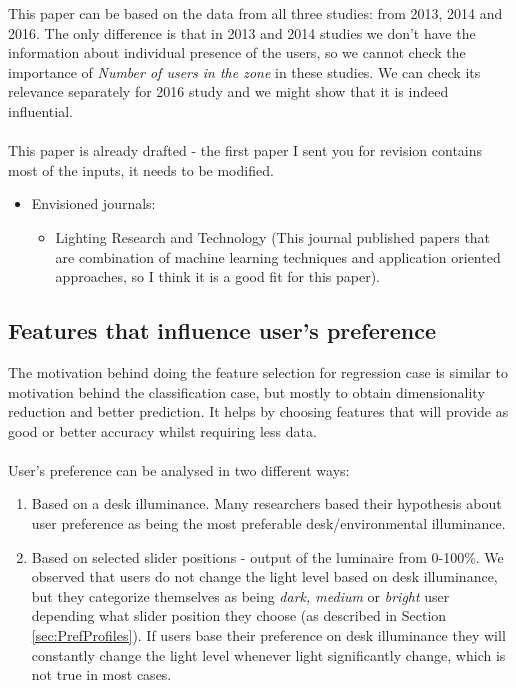 \documentclass[a4paper]{article}
\begin{document}
This paper can be based on the data from all three studies: from 2013, 2014 and 2016. The only difference is that in 2013 and 2014 studies we don't have the information about individual presence of the users, so we cannot check the importance of \textit{Number of users in the zone} in these studies. We can check its relevance separately for 2016 study and we might show that it is indeed influential.
\\\\
\color{red} This paper is already drafted - the first paper I sent you for revision contains most of the inputs, it needs to be modified.
\color{black}

	\begin{itemize}
		\item Envisioned journals:
			\begin{itemize}
				\color{blue}
				\item Lighting Research and Technology	(This journal published papers that are combination of machine learning techniques and application oriented approaches, so I think it is a good fit for this paper).			
			\end{itemize}
	\end{itemize}


\subsection{Features that influence user's preference}\label{sec:FeaturePreference}

The motivation behind doing the feature selection for regression case is similar to motivation behind the classification case, but mostly to obtain dimensionality reduction and better prediction.
It helps by choosing features that will provide as good or better accuracy whilst requiring less data.
\\\\
User's preference can be analysed in two different ways:
\begin{enumerate}
\item Based on a desk illuminance. Many researchers based their hypothesis about user preference as being the most preferable desk/environmental illuminance. 
\item Based on selected slider positions - output of the luminaire from 0-100\%. \color{red} We observed that users do not change the light level based on desk illuminance, but they categorize themselves as being \textit{dark, medium} or \textit{bright} user depending what slider position they choose (as described in Section \ref{sec:PrefProfiles}). If users base their preference on desk illuminance they will constantly change the light level whenever light significantly change, which is not true in most cases.
\end{enumerate}
\end{document}
